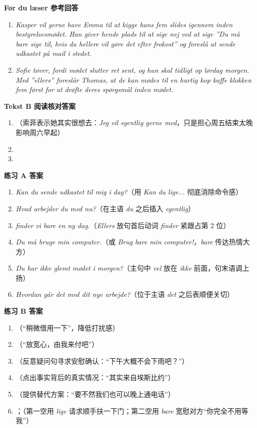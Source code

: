 \begin{answerbox}
\textbf{Før du læser 参考回答}
\begin{enumerate}
  \item \textit{Kasper vil gerne have Emma til at kigge hans fem slides igennem inden bestyrelsesmødet. Han giver hende plads til at sige nej ved at sige ”Du må bare sige til, hvis du hellere vil gøre det efter frokost” og foreslå at sende udkastet på mail i stedet.}
  \item \textit{Sofie tøver, fordi mødet slutter ret sent, og hun skal tidligt op lørdag morgen. Med ”ellers” foreslår Thomas, at de kan mødes til en hurtig kop kaffe klokken fem først for at drøfte deres spørgsmål inden mødet.}
\end{enumerate}

\textbf{Tekst B 阅读核对答案}
\begin{enumerate}
  \item {}（索菲表示她其实很想去：\textit{Jeg vil egentlig gerne med}，只是担心周五结束太晚影响周六早起）
  \item {}
  \item {}
\end{enumerate}

\textbf{练习 A 答案}
\begin{enumerate}
  \item \textit{Kan du  sende udkastet til mig i dag?}（用 \textit{Kan du lige...} 彻底消除命令感）
  \item \textit{Hvad arbejder du  med nu?}（在主语 \textit{du} 之后插入 \textit{egentlig}）
  \item \textit{ finder vi bare en ny dag.}（\textit{Ellers} 放句首后动词 \textit{finder} 紧跟占第 2 位）
  \item \textit{Du må  bruge min computer.}（或 \textit{Brug bare min computer!}，\textit{bare} 传达热情大方）
  \item \textit{Du har  ikke glemt mødet i morgen?}（主句中 \textit{vel} 放在 \textit{ikke} 前面，句末语调上扬）
  \item \textit{Hvordan går det  med dit nye arbejde?}（位于主语 \textit{det} 之后表顺便关切）
\end{enumerate}

\textbf{练习 B 答案}
\begin{enumerate}
  \item {}（“稍微借用一下”，降低打扰感）
  \item {}（“放宽心，由我来付吧”）
  \item {}（反意疑问句寻求安慰确认：“下午大概不会下雨吧？”）
  \item {}（点出事实背后的真实情况：“其实来自埃斯比约”）
  \item {}（提供替代方案：“要不然我们也可以晚上通电话”）
  \item {}；（第一空用 \textit{lige} 请求顺手扶一下门；第二空用 \textit{bare} 宽慰对方“你完全不用等我”）
\end{enumerate}


\end{answerbox}
